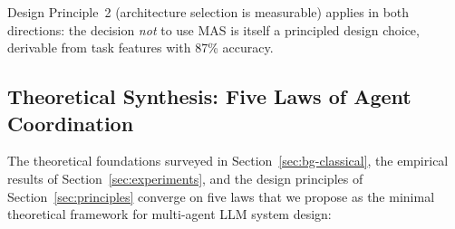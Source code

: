 \documentclass{article}
\begin{document}
\noindent
Design Principle~2 (architecture selection is measurable) applies in both
directions: the decision \emph{not} to use MAS is itself a principled design choice,
derivable from task features with 87\% accuracy.

\subsection{Theoretical Synthesis: Five Laws of Agent Coordination}
\label{sec:disc-laws}

The theoretical foundations surveyed in Section~\ref{sec:bg-classical}, the empirical
results of Section~\ref{sec:experiments}, and the design principles of
Section~\ref{sec:principles} converge on five laws that we propose as the minimal
theoretical framework for multi-agent LLM system design:
\end{document}
